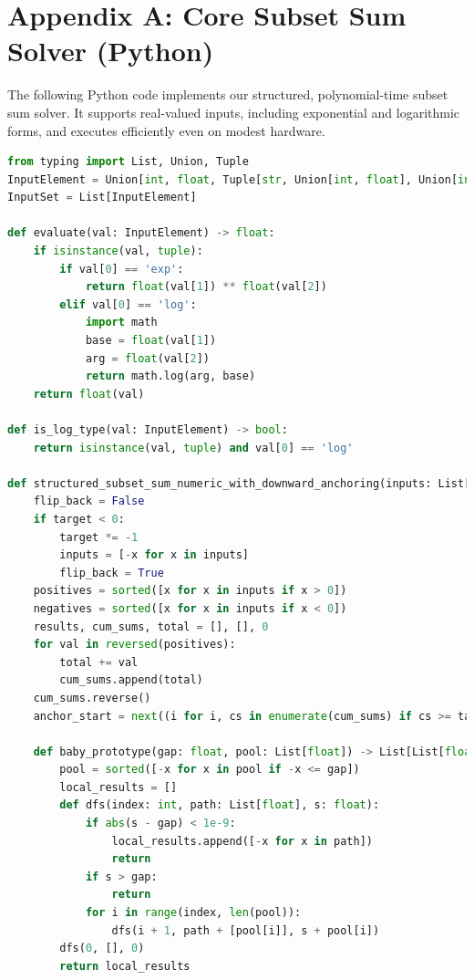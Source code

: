 \documentclass[11pt]{article}
\begin{document}
\vspace{50}


\appendix
\section*{Appendix A: Core Subset Sum Solver (Python)}
\vspace{-1mm}
\noindent
The following Python code implements our structured, polynomial-time subset sum solver. It supports real-valued inputs, including exponential and logarithmic forms, and executes efficiently even on modest hardware.

\begin{lstlisting}[language=Python, basicstyle=\ttfamily\footnotesize, breaklines=true]
from typing import List, Union, Tuple
InputElement = Union[int, float, Tuple[str, Union[int, float], Union[int, float]]]
InputSet = List[InputElement]

def evaluate(val: InputElement) -> float:
    if isinstance(val, tuple):
        if val[0] == 'exp':
            return float(val[1]) ** float(val[2])
        elif val[0] == 'log':
            import math
            base = float(val[1])
            arg = float(val[2])
            return math.log(arg, base)
    return float(val)

def is_log_type(val: InputElement) -> bool:
    return isinstance(val, tuple) and val[0] == 'log'

def structured_subset_sum_numeric_with_downward_anchoring(inputs: List[float], target: float) -> List[List[float]]:
    flip_back = False
    if target < 0:
        target *= -1
        inputs = [-x for x in inputs]
        flip_back = True
    positives = sorted([x for x in inputs if x > 0])
    negatives = sorted([x for x in inputs if x < 0])
    results, cum_sums, total = [], [], 0
    for val in reversed(positives):
        total += val
        cum_sums.append(total)
    cum_sums.reverse()
    anchor_start = next((i for i, cs in enumerate(cum_sums) if cs >= target), len(positives))

    def baby_prototype(gap: float, pool: List[float]) -> List[List[float]]:
        pool = sorted([-x for x in pool if -x <= gap])
        local_results = []
        def dfs(index: int, path: List[float], s: float):
            if abs(s - gap) < 1e-9:
                local_results.append([-x for x in path])
                return
            if s > gap:
                return
            for i in range(index, len(pool)):
                dfs(i + 1, path + [pool[i]], s + pool[i])
        dfs(0, [], 0)
        return local_results


\end{lstlisting}
\end{document}
